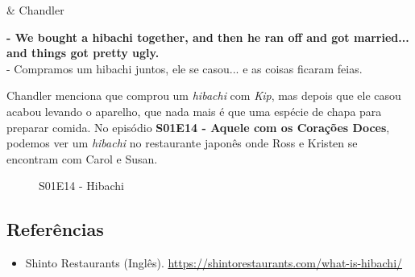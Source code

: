\begin{tcolorbox}[enhanced,center upper,
    drop fuzzy shadow southeast, boxrule=0.3pt,
    lower separated=false, breakable,
    colframe=black!30!dialogoBorder,colback=white]
\begin{minipage}[c]{0.16\linewidth}
   & \centering \scriptsize{Chandler}
\end{minipage}
\hfill
\begin{minipage}[c]{0.8\linewidth}
  \textbf{- We bought a hibachi together, and then he ran off and got married... and things got pretty ugly.}\\
  - Compramos um hibachi juntos, ele se casou...  e as coisas ficaram feias.
\end{minipage}
\end{tcolorbox}

Chandler menciona que comprou um \emph{hibachi} com \emph{Kip}, mas
depois que ele casou acabou levando o aparelho, que nada mais é que uma
espécie de chapa para preparar comida. No episódio
\textbf{\textcolor{primarycolor}{S01E14 - Aquele com os Corações Doces}},
podemos ver um \emph{hibachi} no restaurante japonês onde Ross e Kristen
se encontram com Carol e Susan.

\begin{figure}
  \centering
    \caption{S01E14 - Hibachi\label{fig:s01-e14-hibachi}}
\end{figure}

\hypertarget{referuxeancias-3}{%
\subsection{Referências}\label{referuxeancias-3}}

\begin{itemize}
\tightlist
\item
  \sloppy Shinto Restaurants (Inglês). \url{https://shintorestaurants.com/what-is-hibachi/}
\end{itemize}
